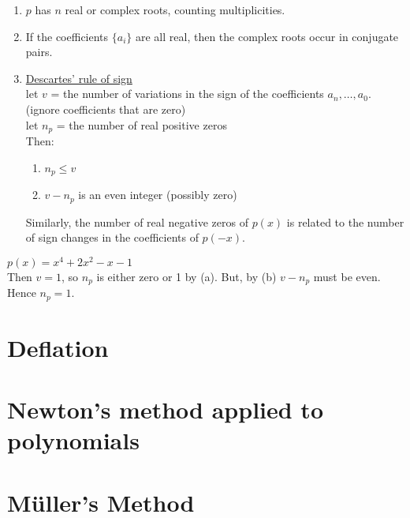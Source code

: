 \begin{enumerate}
    \item $p$ has $n$ real or complex roots, counting multiplicities. \\
    \item If the coefficients $\{ a_i \}$ are all real, then the complex roots occur in conjugate pairs.
    \item \underline{Descartes' rule of sign} \\
        let $v$ = the number of variations in the sign of the coefficients $a_n, \dots, a_0$. (ignore coefficients that are zero)\\
        let $n_p$ =  the number of real positive zeros \\
        Then:
            \begin{enumerate}
                \item $n_p \leq v$
                \item $v-n_p$ is an even integer (possibly zero)
            \end{enumerate}
        Similarly, the number of real negative zeros of $p(x)$ is related to the number of sign changes in the coefficients of $p(-x)$.
\end{enumerate}

\begin{example}
$p(x) = x^4 + 2x^2 - x - 1$ \\

Then $v=1$, so $n_p$ is either zero or 1 by (a). But, by (b) $v-n_p$ must be even. Hence $n_p=1$. 
\end{example}



\section{Deflation}

\section{Newton's method applied to polynomials}

\section{M{\"u}ller's Method}



